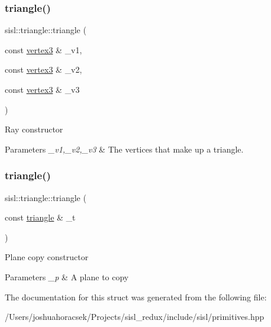 \subsubsection{\texorpdfstring{triangle()}{triangle()}\hspace{0.1cm}{\footnotesize\ttfamily [1/2]}}
{\footnotesize\ttfamily sisl\+::triangle\+::triangle (\begin{DoxyParamCaption}\item[{const \hyperlink{structsisl_1_1vertex3}{vertex3} \&}]{\+\_\+v1,  }\item[{const \hyperlink{structsisl_1_1vertex3}{vertex3} \&}]{\+\_\+v2,  }\item[{const \hyperlink{structsisl_1_1vertex3}{vertex3} \&}]{\+\_\+v3 }\end{DoxyParamCaption})\hspace{0.3cm}{\ttfamily [inline]}}

Ray constructor 
\begin{DoxyParams}{Parameters}
{\em \+\_\+v1,\+\_\+v2,\+\_\+v3} & The vertices that make up a triangle. \\
\hline
\end{DoxyParams}
\mbox{\label{structsisl_1_1triangle_adae1a504fbc6782f22a434897ad39b1c}} 
\subsubsection{\texorpdfstring{triangle()}{triangle()}\hspace{0.1cm}{\footnotesize\ttfamily [2/2]}}
{\footnotesize\ttfamily sisl\+::triangle\+::triangle (\begin{DoxyParamCaption}\item[{const \hyperlink{structsisl_1_1triangle}{triangle} \&}]{\+\_\+t }\end{DoxyParamCaption})\hspace{0.3cm}{\ttfamily [inline]}}

Plane copy constructor 
\begin{DoxyParams}{Parameters}
{\em \+\_\+p} & A plane to copy \\
\hline
\end{DoxyParams}


The documentation for this struct was generated from the following file\+:\begin{DoxyCompactItemize}
\item 
/\+Users/joshuahoracsek/\+Projects/sisl\+\_\+redux/include/sisl/primitives.\+hpp\end{DoxyCompactItemize}
